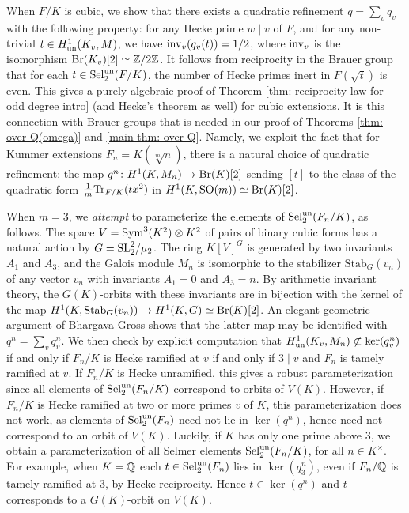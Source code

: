 \documentclass[11pt,a4paper]{amsart}
\def\Z{{\rm \mathbb{Z}}}
\def\Q{{\rm \mathbb{Q}}}
\def\un{{\rm un}}
\def\inv{{\rm inv}}
\def\Tr{{\rm Tr}}
\def\Br{{\rm Br}}
\def\SL{{\rm SL}}
\def\Sym{{\rm Sym}}
\def\Sel{{\rm Sel}}
\numberwithin{equation}{section}
\begin{document}
When $F/K$ is cubic, we show that there exists a quadratic refinement $q = \sum_v q_v$ with the following property:  for any Hecke prime $w \mid v$ of $F$, and for any non-trivial $t \in H^1_{\un}(K_v, M)$, we have $\inv_v(q_v(t)) = 1/2$, where $\inv_v$ is the isomorphism  $\Br(K_v)[2] \simeq \Z/2\Z$.  It follows from reciprocity in the Brauer group that for each $t \in \Sel_2^\un(F/K)$, the number of Hecke primes inert in $F(\sqrt{t})$ is even. This gives a purely algebraic proof of Theorem \ref{thm: reciprocity law for odd degree intro} (and Hecke's theorem as well) for cubic extensions. It is this connection with Brauer groups that is needed in our proof of Theorems \ref{thm: over Q(omega)} and \ref{main thm: over Q}.
Namely, we exploit the fact that for Kummer extensions $F_n = K(\sqrt[m]{n})$, there is a natural choice of quadratic refinement: the map $q^n \colon H^1(K, M_n) \to \Br(K)[2]$ sending $[t]$ to the class of the quadratic form $\frac{1}{m}\Tr_{F/K}(t x^2)$ in $H^1(K, \mathrm{SO}(m)) \simeq \Br(K)[2]$. 

When $m = 3$, we {\it attempt} to parameterize the elements of $\Sel_2^\un(F_n/K)$, as follows. The space $V = \Sym^3(K^2) \otimes K^2$ of pairs of binary cubic forms has a natural action by $G = \SL_2^2/\mu_2$. The ring $K[V]^G$ is generated by two invariants $A_1$ and $A_3$, and the Galois module $M_n$ is isomorphic to the stabilizer $\mathrm{Stab}_G(v_n)$ of any vector $v_n$ with invariants $A_1 = 0$ and $A_3 = n$. By arithmetic invariant theory, the $G(K)$-orbits with these invariants are in bijection with the kernel of the map $ H^1(K, \mathrm{Stab}_G(v_n)) \to H^1(K,G) \simeq \Br(K)[2]$. An elegant geometric argument of Bhargava-Gross \cite{BhargavaGross2013} shows that the latter map may be identified with $q^n = \sum_v q^n_v$. We then check by explicit computation that $H^1_\un(K_v, M_n)\not\subset\ker(q^n_v)$ if and only if $F_n/K$ is Hecke ramified at $v$ if and only if $3\mid v$ and $F_n$ is tamely ramified at $v$.  If $F_n/K$ is Hecke unramified, this gives a robust parameterization since all elements of $\Sel_2^\un(F_n/K)$ correspond to orbits of $V(K)$. However, if $F_n/K$ is Hecke ramified at two or more primes $v$ of $K$, this parameterization does not work, as elements of $\Sel_2^\un(F_n)$ need not lie in $\ker(q^n)$, hence need not correspond to an orbit of $V(K)$.  Luckily, if $K$ has  only  one prime above $3$, we obtain a parameterization of all Selmer elements $\Sel_2^\un(F_n/K)$, for all $n \in K^\times$. For example, when $K = \Q$ each $t \in \Sel_2^\un(F_n)$ lies in $\ker(q^n_3)$, even if $F_n/\Q$ is tamely ramified at $3$, by Hecke reciprocity.  Hence  $t \in \ker(q^n)$ and  $t$ corresponds to a $G(K)$-orbit on $V(K)$.       
\end{document}
